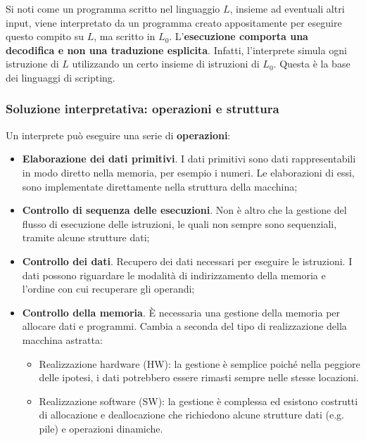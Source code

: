 \documentclass[a4paper]{article}
\begin{document}
	\noindent
	Si noti come un programma scritto nel linguaggio $L$, insieme ad eventuali altri input, viene interpretato da un programma creato appositamente per eseguire questo compito su $L$, ma scritto in $L_{0}$. L'\textbf{esecuzione comporta una decodifica e non una traduzione esplicita}. Infatti, l'interprete simula ogni istruzione di $L$ utilizzando un certo insieme di istruzioni di $L_{0}$. Questa è la base dei linguaggi di scripting.
	
	\subsubsection{Soluzione interpretativa: operazioni e struttura}
	
	Un interprete può eseguire una serie di \textbf{operazioni}:
	\begin{itemize}
		\item \textcolor{Red3}{\textbf{Elaborazione dei dati primitivi}}. I dati primitivi sono dati rappresentabili in modo diretto nella memoria, per esempio i numeri. Le elaborazioni di essi, sono implementate direttamente nella struttura della macchina;
		
		\item \textcolor{Red3}{\textbf{Controllo di sequenza delle esecuzioni}}. Non è altro che la gestione del flusso di esecuzione delle istruzioni, le quali non sempre sono sequenziali, tramite alcune strutture dati;
		
		\item \textcolor{Red3}{\textbf{Controllo dei dati}}. Recupero dei dati necessari per eseguire le istruzioni. I dati possono riguardare le modalità di indirizzamento della memoria e l'ordine con cui recuperare gli operandi;
		
		\item \textcolor{Red3}{\textbf{Controllo della memoria}}. È necessaria una gestione della memoria per allocare dati e programmi. Cambia a seconda del tipo di realizzazione della macchina astratta:
		\begin{itemize}
			\item Realizzazione hardware (HW): la gestione è semplice poiché nella peggiore delle ipotesi, i dati potrebbero essere rimasti sempre nelle stesse locazioni.
			
			\item Realizzazione software (SW): la gestione è complessa ed esistono costrutti di allocazione e deallocazione che richiedono alcune strutture dati (e.g. pile) e operazioni dinamiche.
		\end{itemize}
	\end{itemize}
\end{document}
